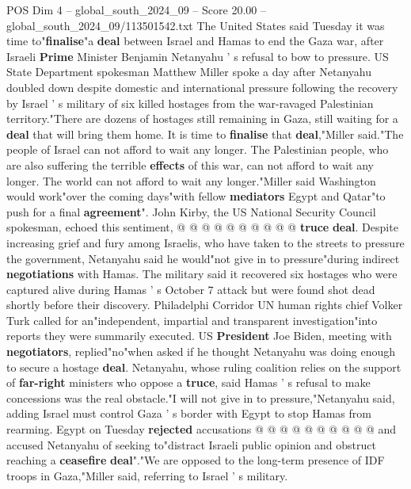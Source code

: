 \begin{textsample}{POS Dim 4 – global\_south\_2024\_09 – Score 20.00 – global\_south\_2024\_09/113501542.txt}  \label{ex:f4_pos_295}
The United States said Tuesday it was time to"\textbf{finalise}"a \textbf{deal} between Israel and Hamas to end the Gaza war, after Israeli \textbf{Prime} Minister Benjamin Netanyahu ' s refusal to bow to pressure.
US State Department spokesman Matthew Miller spoke a day after Netanyahu doubled down despite domestic and international pressure following the recovery by Israel ' s military of six killed hostages from the war-ravaged Palestinian territory."There are dozens of hostages still remaining in Gaza, still waiting for a \textbf{deal} that will bring them home.
It is time to \textbf{finalise} that \textbf{deal},"Miller said."The people of Israel can not afford to wait any longer.
The Palestinian people, who are also suffering the terrible \textbf{effects} of this war, can not afford to wait any longer.
The world can not afford to wait any longer."Miller said Washington would work"over the coming days"with fellow \textbf{mediators} Egypt and Qatar"to push for a final \textbf{agreement}".
John Kirby, the US National Security Council spokesman, echoed this sentiment, @ @ @ @ @ @ @ @ @ @ \textbf{truce} \textbf{deal}.
Despite increasing grief and fury among Israelis, who have taken to the streets to pressure the government, Netanyahu said he would"not give in to pressure"during indirect \textbf{negotiations} with Hamas.
The military said it recovered six hostages who were captured alive during Hamas ' s October 7 attack but were found shot dead shortly before their discovery.
Philadelphi Corridor UN human rights chief Volker Turk called for an"independent, impartial and transparent investigation"into reports they were summarily executed.
US \textbf{President} Joe Biden, meeting with \textbf{negotiators}, replied"no"when asked if he thought Netanyahu was doing enough to secure a hostage \textbf{deal}.
Netanyahu, whose ruling coalition relies on the support of \textbf{far-right} ministers who oppose a \textbf{truce}, said Hamas ' s refusal to make concessions was the real obstacle."I will not give in to pressure,"Netanyahu said, adding Israel must control Gaza ' s border with Egypt to stop Hamas from rearming.
Egypt on Tuesday \textbf{rejected} accusations @ @ @ @ @ @ @ @ @ @ and accused Netanyahu of seeking to"distract Israeli public opinion and obstruct reaching a \textbf{ceasefire} \textbf{deal}"."We are opposed to the long-term presence of IDF troops in Gaza,"Miller said, referring to Israel ' s military.

\end{textsample}
